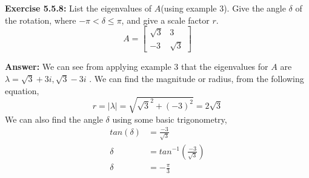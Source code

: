 \documentclass{amsart}
\begin{document}
\vspace{1in}


\noindent\textbf{Exercise 5.5.8: } List the eigenvalues of $A$(using example 3). Give the angle $\delta$ of the rotation, where $-\pi < \delta \leq \pi$, and give a scale factor $r$.
\begin{equation*}
A = 
\begin{bmatrix}
\sqrt{3} &3\\
-3 &\sqrt{3}
\end{bmatrix}
\end{equation*}

\noindent \textbf{Answer: }We can see from applying example 3 that the eigenvalues for $A$ are $\lambda = \sqrt{3}+3i,\sqrt{3}-3i$ . We can find the magnitude or radius, from the following equation,
\begin{equation*}
r = |\lambda| = \sqrt{\sqrt{3}^2+(-3)^2} = 2\sqrt{3}
\end{equation*}
We can also find the angle $\delta$ using some basic trigonometry,
\begin{align*}
tan(\delta) &= \frac{-3}{\sqrt{3}}\\
\delta &= tan^{-1}(\frac{-3}{\sqrt{3}})\\
\delta &= -\frac{\pi}{3} 
\end{align*}

\vspace{1in}
\end{document}
